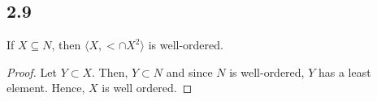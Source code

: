\subsection*{2.9} If $X \subseteq N$, then $\langle X, < \cap X^2 \rangle$ is well-ordered.

\begin{proof}
Let $Y \subset X$. Then, $Y \subset N$ and since $N$ is well-ordered, $Y$ has a least element. Hence, $X$ is well ordered.
\end{proof}

